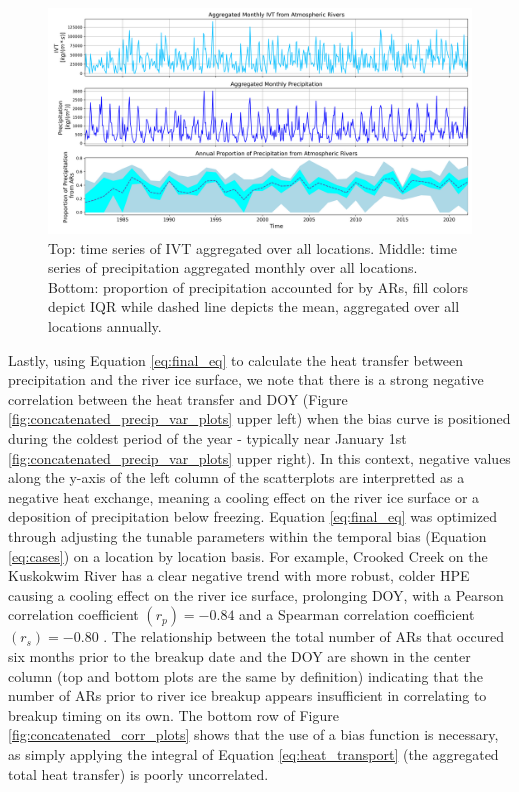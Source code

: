 \documentclass[draft]{AR_analysis_}
\begin{document}
\begin{figure}
\centering
\includegraphics[width=1.0\textwidth]{./images/IVT_Precip_proportion_over_time.png}
\caption{Top: time series of IVT aggregated over all locations.
	Middle: time series of precipitation aggregated monthly over all
	locations. Bottom: proportion of precipitation accounted for by
	ARs, fill colors depict IQR while dashed line depicts the mean,
	aggregated over all locations annually. }
\label{fig:IVT_Precip_proportion_over_time}
\end{figure}

Lastly, using Equation \ref{eq:final_eq} to calculate the heat transfer
between precipitation and the river ice surface, we note that there is a
strong negative correlation between the heat transfer and DOY (Figure
\ref{fig:concatenated_precip_var_plots} upper left) when the bias curve
is positioned during the coldest period of the year - typically near
January 1st \ref{fig:concatenated_precip_var_plots} upper right). In
this context, negative values along the y-axis of the left column 
of the scatterplots are interpretted
as a negative heat exchange, meaning a cooling effect on the river ice
surface or a deposition of precipitation below freezing. Equation
\ref{eq:final_eq} was optimized through adjusting the tunable parameters
within the temporal bias (Equation \ref{eq:cases}) on a location by
location basis. For example, Crooked Creek on the Kuskokwim River has a
clear negative trend with more robust, colder HPE causing a cooling effect on the
river ice surface, prolonging DOY, with a Pearson correlation
coefficient $ (r_{p} )= -0.84$ and a Spearman correlation coefficient
$(r_{s}) = -0.80$ . The relationship between the total
number of ARs that occured six months prior to the breakup date and the
DOY are shown in the center column (top and bottom plots are the same by
definition) indicating that the number of ARs prior to river ice breakup
appears insufficient in correlating to breakup timing on its own. The
bottom row of Figure \ref{fig:concatenated_corr_plots} shows that the
use of a bias function is necessary, as simply applying the integral of
Equation \ref{eq:heat_transport} (the aggregated total heat transfer) is
poorly uncorrelated. 
\end{document}
